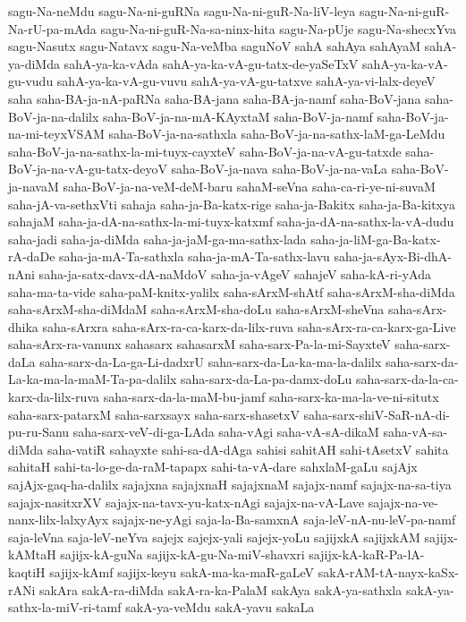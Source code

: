 {sagu-Na-neMdu
sagu-Na-ni-guRNa
sagu-Na-ni-guR-Na-liV-leya
sagu-Na-ni-guR-Na-rU-pa-mAda
sagu-Na-ni-guR-Na-sa-ninx-hita
sagu-Na-pUje
sagu-Na-shecxYva
sagu-Nasutx
sagu-Natavx
sagu-Na-veMba
saguNoV
sahA
sahAya
sahAyaM
sahA-ya-diMda
sahA-ya-ka-vAda
sahA-ya-ka-vA-gu-tatx-de-yaSeTxV
sahA-ya-ka-vA-gu-vudu
sahA-ya-ka-vA-gu-vuvu
sahA-ya-vA-gu-tatxve
sahA-ya-vi-lalx-deyeV
saha
saha-BA-ja-nA-paRNa
saha-BA-jana
saha-BA-ja-namf
saha-BoV-jana
saha-BoV-ja-na-dalilx
saha-BoV-ja-na-mA-KAyxtaM
saha-BoV-ja-namf
saha-BoV-ja-na-mi-teyxVSAM
saha-BoV-ja-na-sathxla
saha-BoV-ja-na-sathx-laM-ga-LeMdu
saha-BoV-ja-na-sathx-la-mi-tuyx-cayxteV
saha-BoV-ja-na-vA-gu-tatxde
saha-BoV-ja-na-vA-gu-tatx-deyoV
saha-BoV-ja-nava
saha-BoV-ja-na-vaLa
saha-BoV-ja-navaM
saha-BoV-ja-na-veM-deM-baru
sahaM-seVna
saha-ca-ri-ye-ni-suvaM
saha-jA-va-sethxVti
sahaja
saha-ja-Ba-katx-rige
saha-ja-Bakitx
saha-ja-Ba-kitxya
sahajaM
saha-ja-dA-na-sathx-la-mi-tuyx-katxmf
saha-ja-dA-na-sathx-la-vA-dudu
saha-jadi
saha-ja-diMda
saha-ja-jaM-ga-ma-sathx-lada
saha-ja-liM-ga-Ba-katx-rA-daDe
saha-ja-mA-Ta-sathxla
saha-ja-mA-Ta-sathx-lavu
saha-ja-sAyx-Bi-dhA-nAni
saha-ja-satx-davx-dA-naMdoV
saha-ja-vAgeV
sahajeV
saha-kA-ri-yAda
saha-ma-ta-vide
saha-paM-knitx-yalilx
saha-sArxM-shAtf
saha-sArxM-sha-diMda
saha-sArxM-sha-diMdaM
saha-sArxM-sha-doLu
saha-sArxM-sheVna
saha-sArx-dhika
saha-sArxra
saha-sArx-ra-ca-karx-da-lilx-ruva
saha-sArx-ra-ca-karx-ga-Live
saha-sArx-ra-vanunx
sahasarx
sahasarxM
saha-sarx-Pa-la-mi-SayxteV
saha-sarx-daLa
saha-sarx-da-La-ga-Li-dadxrU
saha-sarx-da-La-ka-ma-la-dalilx
saha-sarx-da-La-ka-ma-la-maM-Ta-pa-dalilx
saha-sarx-da-La-pa-damx-doLu
saha-sarx-da-la-ca-karx-da-lilx-ruva
saha-sarx-da-la-maM-bu-jamf
saha-sarx-ka-ma-la-ve-ni-situtx
saha-sarx-patarxM
saha-sarxsayx
saha-sarx-shasetxV
saha-sarx-shiV-SaR-nA-di-pu-ru-Sanu
saha-sarx-veV-di-ga-LAda
saha-vAgi
saha-vA-sA-dikaM
saha-vA-sa-diMda
saha-vatiR
sahayxte
sahi-sa-dA-dAga
sahisi
sahitAH
sahi-tAsetxV
sahita
sahitaH
sahi-ta-lo-ge-da-raM-tapapx
sahi-ta-vA-dare
sahxlaM-gaLu
sajAjx
sajAjx-gaq-ha-dalilx
sajajxna
sajajxnaH
sajajxnaM
sajajx-namf
sajajx-na-sa-tiya
sajajx-nasitxrXV
sajajx-na-tavx-yu-katx-nAgi
sajajx-na-vA-Lave
sajajx-na-ve-nanx-lilx-lalxyAyx
sajajx-ne-yAgi
saja-la-Ba-samxnA
saja-leV-nA-nu-leV-pa-namf
saja-leVna
saja-leV-neYva
sajejx
sajejx-yali
sajejx-yoLu
sajijxkA
sajijxkAM
sajijx-kAMtaH
sajijx-kA-guNa
sajijx-kA-gu-Na-miV-shavxri
sajijx-kA-kaR-Pa-lA-kaqtiH
sajijx-kAmf
sajijx-keyu
sakA-ma-ka-maR-gaLeV
sakA-rAM-tA-nayx-kaSx-rANi
sakAra
sakA-ra-diMda
sakA-ra-ka-PalaM
sakAya
sakA-ya-sathxla
sakA-ya-sathx-la-miV-ri-tamf
sakA-ya-veMdu
sakA-yavu
sakaLa
}

